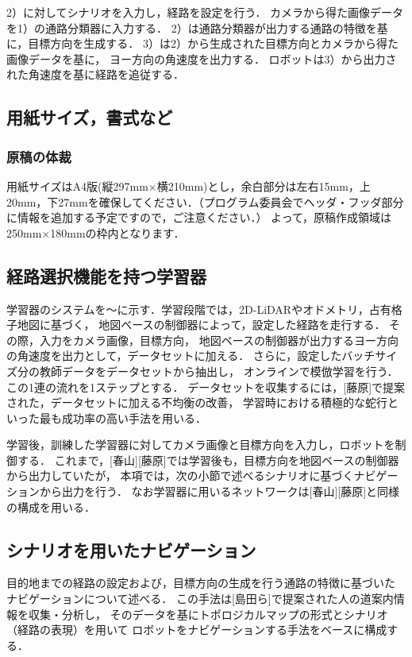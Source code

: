 \documentclass{sice-si}
\begin{document}
2）に対してシナリオを入力し，経路を設定を行う．
カメラから得た画像データを1）の通路分類器に入力する．
2）は通路分類器が出力する通路の特徴を基に，目標方向を生成する．
3）は2）から生成された目標方向とカメラから得た画像データを基に，
ヨー方向の角速度を出力する．
ロボットは3）から出力された角速度を基に経路を追従する．
\subsection{用紙サイズ，書式など}
\subsubsection{原稿の体裁}
用紙サイズはA4版(縦297mm$\times$横210mm)とし，余白部分は左右15mm，上20mm，下27mmを確保してください．（プログラム委員会でヘッダ・フッダ部分に情報を追加する予定ですので，ご注意ください．）
よって，原稿作成領域は250mm$\times$180mmの枠内となります．

\subsection{経路選択機能を持つ学習器}
学習器のシステムを〜に示す．学習段階では，2D-LiDARやオドメトリ，占有格子地図に基づく，
地図ベースの制御器によって，設定した経路を走行する．
その際，入力をカメラ画像，目標方向，
地図ベースの制御器が出力するヨー方向の角速度を出力として，データセットに加える．
さらに，設定したバッチサイズ分の教師データをデータセットから抽出し，
オンラインで模倣学習を行う．この1連の流れを1ステップとする．
データセットを収集するには，[藤原]で提案された，データセットに加える不均衡の改善，
学習時における積極的な蛇行といった最も成功率の高い手法を用いる．\par
学習後，訓練した学習器に対してカメラ画像と目標方向を入力し，ロボットを制御する．
これまで，[春山][藤原]では学習後も，目標方向を地図ベースの制御器から出力していたが，
本項では，次の小節で述べるシナリオに基づくナビゲーションから出力を行う．
なお学習器に用いるネットワークは[春山][藤原]と同様の構成を用いる．

\subsection{シナリオを用いたナビゲーション}
目的地までの経路の設定および，目標方向の生成を行う通路の特徴に基づいた
ナビゲーションについて述べる．
この手法は[島田ら]で提案された人の道案内情報を収集・分析し，
そのデータを基にトポロジカルマップの形式とシナリオ（経路の表現）を用いて
ロボットをナビゲーションする手法をベースに構成する．
\end{document}
